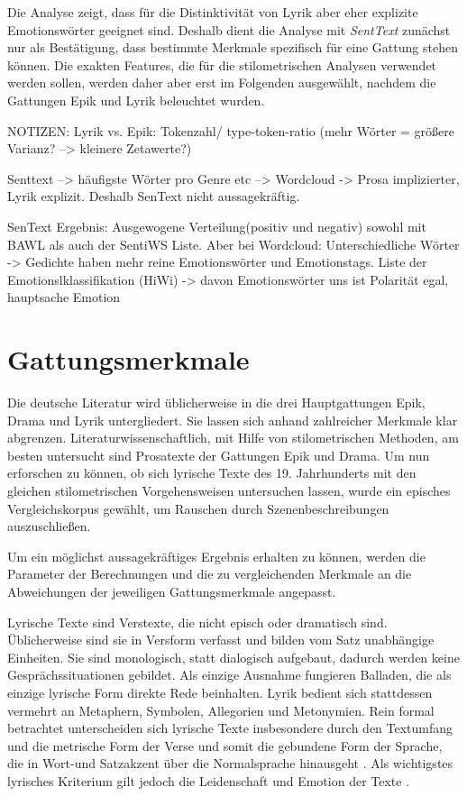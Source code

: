 \documentclass[a4paper,10p]{article}
\begin{document}
Die Analyse zeigt, dass für die Distinktivität von Lyrik aber eher explizite Emotionswörter geeignet sind. Deshalb dient die Analyse mit \textit{SentText} zunächst nur als Bestätigung, dass bestimmte Merkmale spezifisch für eine Gattung stehen können. Die exakten Features, die für die stilometrischen Analysen verwendet werden sollen, werden daher aber erst im Folgenden ausgewählt, nachdem die Gattungen Epik und Lyrik beleuchtet wurden.\par 


NOTIZEN:
Lyrik vs. Epik: Tokenzahl/ type-token-ratio (mehr Wörter = größere Varianz? --> kleinere Zetawerte?)

Senttext --> häufigste Wörter pro Genre etc --> Wordcloud
-> Prosa implizierter, Lyrik explizit. Deshalb SenText nicht aussagekräftig.

SenText Ergebnis: Ausgewogene Verteilung(positiv und negativ) sowohl mit BAWL als auch der SentiWS Liste. Aber bei Wordcloud: Unterschiedliche Wörter -> Gedichte haben mehr reine Emotionswörter und Emotionstags.
Liste der Emotionslklassifikation (HiWi) -> davon Emotionswörter
uns ist Polarität egal, hauptsache Emotion


\section{Gattungsmerkmale}
Die deutsche Literatur wird üblicherweise in die drei Hauptgattungen Epik, Drama und Lyrik untergliedert. Sie lassen sich anhand zahlreicher Merkmale klar abgrenzen. Literaturwissenschaftlich, mit Hilfe von stilometrischen Methoden, am besten untersucht sind Prosatexte der Gattungen Epik und Drama. Um nun erforschen zu können, ob sich lyrische Texte des 19. Jahrhunderts mit den gleichen stilometrischen Vorgehensweisen untersuchen lassen, wurde ein episches Vergleichskorpus gewählt, um Rauschen durch Szenenbeschreibungen auszuschließen. \par 

Um ein möglichst aussagekräftiges Ergebnis erhalten zu können, werden die Parameter der Berechnungen und die zu vergleichenden Merkmale an die Abweichungen der jeweiligen Gattungsmerkmale angepasst. \par 

Lyrische Texte sind Verstexte, die nicht episch oder dramatisch sind. Üblicherweise sind sie in Versform verfasst und bilden vom Satz unabhängige Einheiten. Sie sind monologisch, statt dialogisch aufgebaut, dadurch werden keine Gesprächssituationen gebildet. Als einzige Ausnahme fungieren Balladen, die als einzige lyrische Form direkte Rede beinhalten. Lyrik bedient sich stattdessen vermehrt an Metaphern, Symbolen, Allegorien und Metonymien. Rein formal betrachtet unterscheiden sich lyrische Texte insbesondere durch den Textumfang und die metrische Form der Verse und somit die gebundene Form der Sprache, die in Wort-und Satzakzent über die Normalsprache hinausgeht \citep[vgl.][S. 111]{Krah2006}. Als wichtigstes lyrisches Kriterium gilt jedoch die Leidenschaft und Emotion der Texte \citep[vgl.][S. 462-464]{SchweikleGunther;Burdorf2007}. \par 
\end{document}
